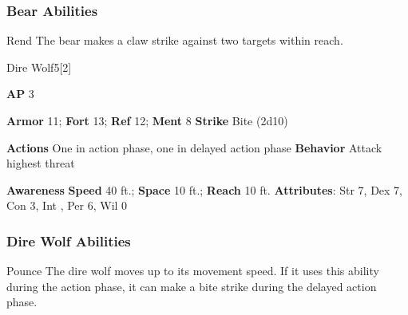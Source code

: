 \subsubsection{Bear Abilities}

\begin{ability}{Rend}
The bear makes a claw strike against two targets within reach.
\end{ability}






\begin{monsection}{Dire Wolf}{5}[2]
\vspace{-1em}\vspace{-1em}
\begin{spellcontent}
\begin{spelltargetinginfo}
{\textbf{AP} 3}

\pari \textbf{Armor} 11;
\textbf{Fort} 13;
\textbf{Ref} 12;
\textbf{Ment} 8
\pari \textbf{Strike} Bite  (2d10)


\pari \textbf{Actions} One in action phase, one in delayed action phase
\pari \textbf{Behavior} Attack highest threat
\end{spelltargetinginfo}
\end{spellcontent}

\begin{monsterfooter}
\pari \textbf{Awareness} 
\pari \textbf{Speed} 40 ft.;
\textbf{Space} 10 ft.;
\textbf{Reach} 10 ft.
\pari \textbf{Attributes}:
Str 7,
Dex 7,
Con 3,
Int ,
Per 6,
Wil 0
\end{monsterfooter}
\end{monsection}


\subsubsection{Dire Wolf Abilities}

\begin{ability}{Pounce}
The dire wolf moves up to its movement speed.
If it uses this ability during the action phase, it can make a bite strike during the delayed action phase.
\end{ability}






